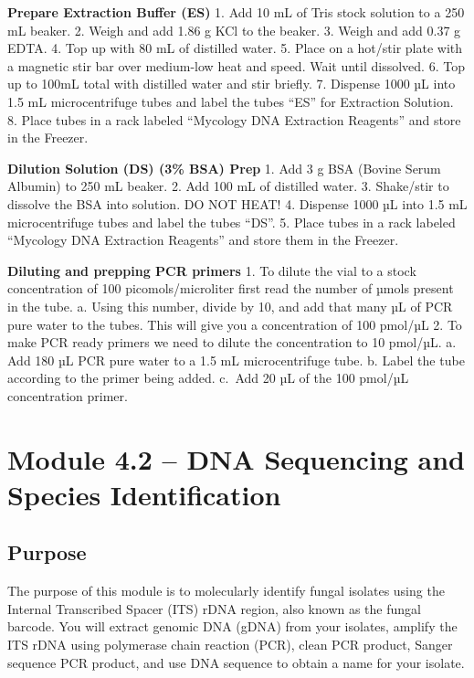 \documentclass[
  letterpaper,
  DIV=11,
  numbers=noendperiod]{scrreprt}
\begin{document}
\textbf{Prepare Extraction Buffer (ES)} 1. Add 10 mL of Tris stock
solution to a 250 mL beaker. 2. Weigh and add 1.86 g KCl to the beaker.
3. Weigh and add 0.37 g EDTA. 4. Top up with 80 mL of distilled water.
5. Place on a hot/stir plate with a magnetic stir bar over medium-low
heat and speed. Wait until dissolved. 6. Top up to 100mL total with
distilled water and stir briefly. 7. Dispense 1000 µL into 1.5 mL
microcentrifuge tubes and label the tubes ``ES'' for Extraction
Solution. 8. Place tubes in a rack labeled ``Mycology DNA Extraction
Reagents'' and store in the Freezer.

\textbf{Dilution Solution (DS) (3\% BSA) Prep} 1. Add 3 g BSA (Bovine
Serum Albumin) to 250 mL beaker. 2. Add 100 mL of distilled water. 3.
Shake/stir to dissolve the BSA into solution. DO NOT HEAT! 4. Dispense
1000 µL into 1.5 mL microcentrifuge tubes and label the tubes ``DS''. 5.
Place tubes in a rack labeled ``Mycology DNA Extraction Reagents'' and
store them in the Freezer.

\textbf{Diluting and prepping PCR primers} 1. To dilute the vial to a
stock concentration of 100 picomols/microliter first read the number of
µmols present in the tube. a. Using this number, divide by 10, and add
that many µL of PCR pure water to the tubes. This will give you a
concentration of 100 pmol/µL 2. To make PCR ready primers we need to
dilute the concentration to 10 pmol/µL. a. Add 180 µL PCR pure water to
a 1.5 mL microcentrifuge tube. b. Label the tube according to the primer
being added. c.~Add 20 µL of the 100 pmol/µL concentration primer.

\section*{Module 4.2 -- DNA Sequencing and Species
Identification}\label{module-4.2-dna-sequencing-and-species-identification}


\subsection*{Purpose}\label{purpose-2}

The purpose of this module is to molecularly identify fungal isolates
using the Internal Transcribed Spacer (ITS) rDNA region, also known as
the fungal barcode. You will extract genomic DNA (gDNA) from your
isolates, amplify the ITS rDNA using polymerase chain reaction (PCR),
clean PCR product, Sanger sequence PCR product, and use DNA sequence to
obtain a name for your isolate.
\end{document}
